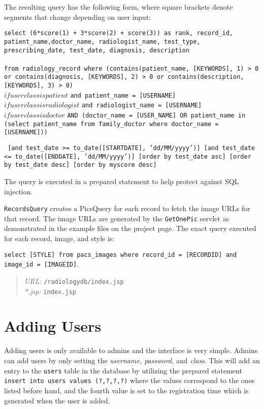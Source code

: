 \documentclass[12pt]{report}
\begin{document}
The resulting query has the following form, where square brackets denote segments that change depending on user input:

\texttt{select (6*score(1) + 3*score(2) + score(3)) as rank, record\_id, \\patient\_name,doctor\_name, radiologist\_name, test\_type, \\prescribing\_date, test\_date, diagnosis, description \\ \\from radiology\_record where (contains(patient\_name, [KEYWORDS], 1) > 0 or contains(diagnosis, [KEYWORDS], 2) > 0 or contains(description, [KEYWORDS], 3) > 0)}\\

$if user class is patient$ \texttt{and patient\_name = [USERNAME]}\\
 
$if user class is radiologist$ \texttt{and radiologist\_name = [USERNAME]}\\
  
$if user class is doctor$ \texttt{AND (doctor\_name = [USER\_NAME] OR patient\_name in\\ (select patient\_name from family\_doctor where doctor\_name = [USERNAME]))}
   
   \texttt{     
        [and test\_date >= to\_date([STARTDATE], 'dd/MM/yyyy')]
        [and test\_date <= to\_date([ENDDATE], 'dd/MM/yyyy')]
	[order by test\_date asc]
	[order by test\_date desc]
	[order by myscore desc]}

The query is executed in a prepared statement to help protect against SQL injection.

\texttt{RecordsQuery} creates a PicsQuery for each record to fetch the image URLs for that record. The image URLs are generated by the \texttt{GetOnePic} servlet as demonstrated in the example files on the project page. The exact query executed for each record, image, and style is: 

 \texttt{select [STYLE] from pacs\_images where record\_id = [RECORDID] and image\_id = [IMAGEID]}.


\begin{quote}
\emph{URL:} \texttt{/radiologydb/index.jsp} \\
\emph{*.jsp: } \texttt{index.jsp} \\
\end{quote}

\section*{Adding Users}
Adding users is only available to admins and the interface is very simple. Admins can add users by only setting the \emph{username, password,} and \emph{class}. This will add an entry to the \texttt{users} table in the database by utilizing the prepared statement \texttt{insert into users values (?,?,?,?)} where the values correspond to the ones listed before hand, and the fourth value is set to the registration time which is generated when the user is added.
\end{document}
